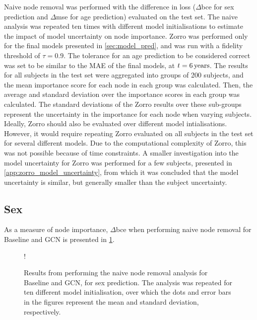 Naive node removal was performed with the difference in loss ($\Delta$\acrshort{bce} for sex prediction and $\Delta$\acrshort{mse} for age prediction) evaluated on the test set. The naive analysis was repeated ten times with different model initialisations to estimate the impact of model uncertainty on node importance. Zorro was performed only for the final models presented in \cref{sec:model_pred}, and was run with a fidelity threshold of $\tau=0.9$. The tolerance for an age prediction to be considered correct was set to be similar to the MAE of the final models, at $t=6\rm\,years$. The results for all subjects in the test set were aggregated into groups of 200 subjects, and the mean importance score for each node in each group was calculated. Then, the average and standard deviation over the importance scores in each group was calculated. The standard deviations of the Zorro results over these sub-groups represent the uncertainty in the importance for each node when varying subjects. Ideally, Zorro should also be evaluated over different model intialisations. However, it would require repeating Zorro evaluated on all subjects in the test set for several different models. Due to the computational complexity of Zorro, this was not possible because of time constraints. A smaller investigation into the model uncertainty for Zorro was performed for a few subjects, presented in \cref{app:zorro_model_uncertainty}, from which it was concluded that the model uncertainty is similar, but generally smaller than the subject uncertainty. 

\subsection{Sex}
\label{sec:results_analysis_sex}
As a measure of node importance, $\Delta$\acrshort{bce} when performing naive node removal for Baseline and GCN is presented in \cref{fig:naive_sex}.

\begin{figure}[!htbp]
    \centering
    \begin{center}
    \resizebox {0.7\linewidth} {!} {
        
    }
    \end{center}
    \caption{Results from performing the naive node removal analysis for Baseline and GCN, for sex prediction. The analysis was repeated for ten different model initialisation, over which the dots and error bars in the figures represent the mean and standard deviation, respectively.}
    \label{fig:naive_sex}
\end{figure}

